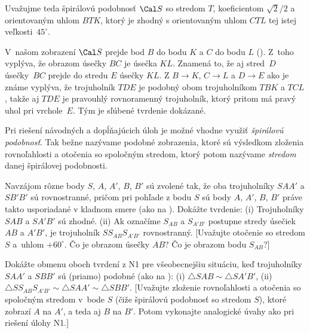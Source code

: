 {Uvažujme teda špirálovú podobnosť $\Cal S$ so stredom $T$,
koeficientom $\sqrt{2}/2$ a orientovaným uhlom $BTK$,
ktorý je zhodný s orientovaným uhlom $CTL$ tej istej veľkosti~$45^{\circ}$.
%

V~našom zobrazení $\Cal S$ prejde bod $B$ do bodu $K$
a $C$ do bodu $L$ (\obr). Z~toho vyplýva, že obrazom
úsečky $BC$ je úsečka $KL$. Znamená to, že aj stred~$D$
úsečky~$BC$ prejde do stredu $E$ úsečky $KL$.
Z $B\to K$, $C\to L$ a $D\to E$ ako je známe vyplýva, že
trojuholník $TDE$ je podobný obom trojuholníkom $TBK$ a $TCL$,
takže aj $TDE$ je pravouhlý rovnoramenný trojuholník, ktorý pritom
má pravý uhol pri vrchole~$E$. Tým je sľúbené tvrdenie dokázané.

{\everypar{}
\smallskip
Pri riešení návodných a dopĺňajúcich úloh je možné vhodne využiť
\emph{\it špirálovú podobnosť}.
Tak bežne nazývame podobné zobrazenia, ktoré sú výsledkom
zloženia rovnoľahlosti a otočenia so spoločným stredom, ktorý potom
nazývame \emph{stredom} danej špirálovej podobnosti.\smallskip
}

Navzájom rôzne body $S$, $A$, $A'$, $B$, $B'$ sú zvolené tak,
že oba trojuholníky $SAA'$ a $SB'B'$ sú rovnostranné, pričom
pri pohľade z bodu $S$ sú body $A$, $A'$, $B$, $B'$ práve takto
usporiadané v kladnom smere (ako na \obr{}). Dokážte tvrdenie:
(i) Trojuholníky $SAB$ a $SA'B'$ sú zhodné.
(ii) Ak označíme $S_{AB}$ a $S_{A'B'}$ postupne stredy úsečiek
$AB$ a $A'B'$, je trojuholník $SS_{AB}S_{A'B'}$ rovnostranný.
%
[Uvažujte otočenie so stredom $S$ a~uhlom $+60^\circ$.
Čo je obrazom úsečky $AB$? Čo je obrazom bodu $S_{AB}$?]

Dokážte obmenu oboch tvrdení z N1 pre všeobecnejšiu situáciu,
keď trojuholníky $SAA'$ a $SBB'$ sú (priamo) podobné (ako na
):\hfil\break
(i) $\triangle SAB\sim\triangle SA'B'$,\qquad
(ii) $\triangle SS_{AB}S_{A'B'}\sim\triangle SAA'\sim\triangle SBB'$.
[Uvažujte zloženie rovnoľahlosti a otočenia so spoločným stredom
v~bode $S$ (čiže špirálovú podobnosť so stredom $S$),
ktoré zobrazí $A$ na $A'$, a teda aj $B$ na $B'$.
Potom vykonajte analogické úvahy ako pri riešení úlohy N1.]

}
